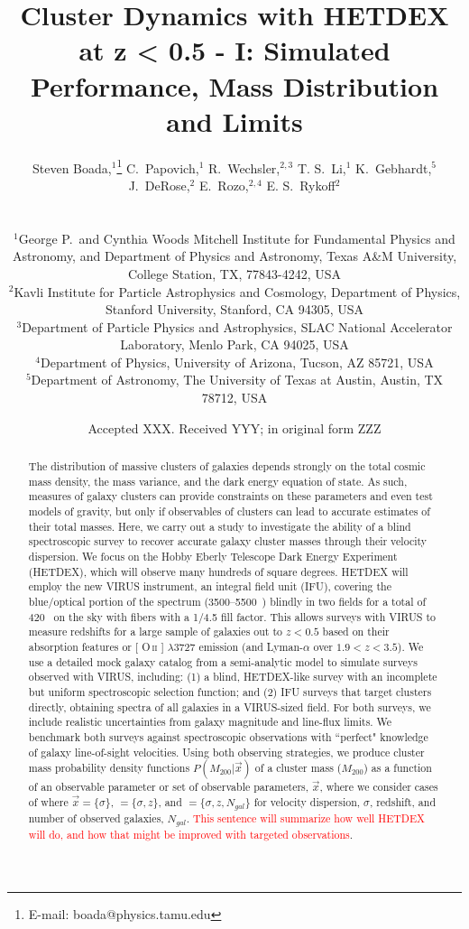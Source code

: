 \documentclass[fleqn,usenatbib]{mnras}
\title[Short Title]{Cluster Dynamics with HETDEX at z < 0.5 - I: Simulated Performance, Mass Distribution and Limits}
\author[S. Boada et al.]
{\parbox{\textwidth}{Steven Boada,$^{1}$\thanks{E-mail: boada@physics.tamu.edu}
C.~Papovich,$^{1}$
R.~Wechsler,$^{2,3}$
T. S.~Li,$^{1}$
K.~Gebhardt,$^{5}$
J.~DeRose,$^{2}$
E.~Rozo,$^{2,4}$
E. S.~Rykoff$^{2}$}\vspace{0.4cm}\
\\
\parbox{\textwidth}{$^{1}$George P.\ and Cynthia Woods Mitchell Institute for Fundamental Physics and Astronomy, and Department of Physics and Astronomy, Texas A\&M University, College Station, TX, 77843-4242, USA\\
$^{2}$Kavli Institute for Particle Astrophysics and Cosmology, Department of Physics, Stanford University, Stanford, CA 94305, USA\\
$^{3}$Department of Particle Physics and Astrophysics, SLAC National Accelerator Laboratory, Menlo Park, CA 94025, USA\\
$^{4}$Department of Physics, University of Arizona, Tucson, AZ 85721, USA\\
$^{5}$Department of Astronomy, The University of Texas at Austin, Austin, TX 78712, USA}}
\date{Accepted XXX. Received YYY; in original form ZZZ}
\makeatletter
\newcommand{\editorial}[1]{\textcolor{red}{#1}}
\DeclareRobustCommand{\ion}[2]{%
\relax\ifmmode
\ifx\testbx\f@series
{\mathbf{#1\,\mathsc{#2}}}\else
{\mathrm{#1\,\mathsc{#2}}}\fi
\else\textup{#1\,{\mdseries\textsc{#2}}}%
\fi}
\makeatother
\begin{document}
\label{firstpage}
\pagerange{\pageref{firstpage}--\pageref{lastpage}}
\maketitle

\begin{abstract}
\noindent
The distribution of massive clusters of galaxies depends strongly on the total cosmic mass density, the mass variance, and the dark energy equation of state. As such, measures of galaxy clusters can provide constraints on these parameters and even test models of gravity, but only if observables of clusters can lead to accurate estimates of their total masses. Here, we carry out a study to investigate the ability of a blind spectroscopic survey to recover accurate galaxy cluster masses through their velocity dispersion. We focus on the Hobby Eberly Telescope Dark Energy Experiment (HETDEX), which will observe many hundreds of square degrees. HETDEX will employ the new VIRUS instrument, an integral field unit (IFU), covering the blue/optical portion of the spectrum (3500--5500~\AAA) blindly in two fields for a total of 420 \degsq\ on the sky with fibers with a 1/4.5 fill factor. This allows surveys with VIRUS to measure redshifts for a large sample of galaxies out to $z < 0.5$ based on their absorption features or [\ion{O}{ii}] $\lambda$3727 emission (and Lyman-$\alpha$ over $1.9 < z < 3.5$). We use a detailed mock galaxy catalog from a semi-analytic model to simulate surveys observed with VIRUS, including: (1) a blind, HETDEX-like survey with an incomplete but uniform spectroscopic selection function; and (2) IFU surveys that target clusters directly, obtaining spectra of all galaxies in a VIRUS-sized field. For both surveys, we include realistic uncertainties from galaxy magnitude and line-flux limits. We benchmark both surveys against spectroscopic observations with ``perfect" knowledge of galaxy line-of-sight velocities. Using both observing strategies, we produce cluster mass probability density functions $P(M_{200}|\vec{x})$ of a cluster mass ($M_{200}$) as a function of an observable parameter or set of observable parameters, $\vec{x}$, where we consider cases of where $\vec{x} = \{\sigma\}$, $=\{\sigma, z\}$, and $=\{\sigma,z, N_{gal}\}$ for velocity dispersion, $\sigma$, redshift, and number of observed galaxies, $N_{gal}$. \editorial{This sentence will summarize how well HETDEX will do, and how that might be improved with targeted observations}.
\end{abstract}
\end{document}
